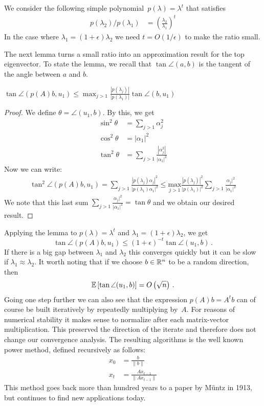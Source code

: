 We consider the following simple polynomial~$p(\lambda)=\lambda^t$ that 
satisfies
\begin{align*}
    p(\lambda_2)/p(\lambda_1) &= \left(\frac{\lambda_2}{\lambda_1}\right)^t
\end{align*}
In the case where $\lambda_1=(1+\epsilon)\lambda_2$ we need $t=O(1/\epsilon)$ 
to make the ratio small.

The next lemma turns a small ratio into an approximation result for the
top eigenvector. To state the lemma, we recall that $\tan \angle (a,b)$ is the
tangent of the angle between $a$ and $b.$

\begin{lemma}
$\tan \angle(p(A)b, u_1) \leq \max_{j>1} \frac{|p(\lambda_j)|}{|p(\lambda_1)|}
\tan \angle (b, u_1)$
\end{lemma}

\begin{proof}
We define $\theta = \angle (u_1,b)$. By this, we get
\begin{align*}
    \sin ^2 \theta &=  \sum_{j >1} \alpha_j^2 \\
    \cos ^2 \theta &= |\alpha_1|^2 \\
    \tan^2 \theta &= \sum_{j > 1} \frac{|\alpha_j^2|}{|\alpha_1|^2}
\end{align*}
Now we can write:
\begin{align*}
    \tan^2 \angle (p(A)b, u_1) = \sum_{j>1}
\frac{|p(\lambda_j)\alpha_j|^2}{|p(\lambda_1)\alpha_1|^2} \leq
\underset{j>1}{\text{max}} \frac{|p(\lambda_j)|^2}{|p(\lambda_1)|^2} \sum_{j>1} \frac{\alpha_j |^2}{|\alpha_1| ^2}
\end{align*}
We note that this last sum $ \sum_{j > 1} \frac{\alpha_j |^2}{|\alpha_1| ^2}= \tan \theta$ and we obtain our desired result.
\end{proof}
Applying the lemma to $p(\lambda) = \lambda^t$ and $\lambda_1 =
(1+\epsilon) \lambda_2$, we get  
\[
\tan \angle(p(A)b, u_1) \leq
(1+\epsilon)^{-t} \tan \angle(u_1, b)\,.
\]
If there is a big gap between
$\lambda_1$ and $\lambda_2$ this converges quickly but it can be slow if
$\lambda_1 \approx \lambda_2$. It worth noting that if we choose $b\in\mathbb{R}^n$ to be a
random direction, then
\[
\operatorname*{\mathbb{E}}\left[\tan\angle(u_1,b)\right]=O\left(\sqrt{n}\right)\,.
\]
Going one step further we can also see that the expression $p(A)b=A^tb$ can of
course be built iteratively by repeatedly multiplying by~$A.$ For reasons of
numerical stability it makes sense to normalize after each matrix-vector
multiplication. This preserved the direction of the iterate and therefore does
not change our convergence analysis. The resulting algorithms is the well known
power method, defined recursively as follows:
%
\begin{align*}
x_0 &= \frac{b}{\|b\|} \\
x_t &= \frac{A x_{t-1}}{\|Ax_{t-1}\|}
\end{align*}
%
This method goes back more than hundred years to a paper by M\"untz in 1913, but
continues to find new applications today.
%

